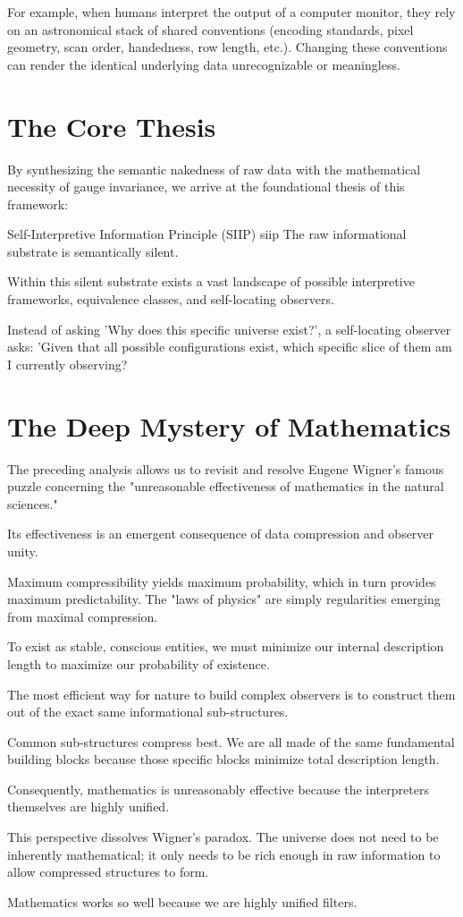 For example, when humans interpret the output of a computer monitor, they rely on an astronomical stack of shared conventions (encoding standards,
pixel geometry, scan order, handedness, row length, etc.). Changing these conventions can render the identical underlying data unrecognizable or meaningless.



\section{The Core Thesis}

By synthesizing the semantic nakedness of raw data with the mathematical necessity of gauge invariance, we arrive at the foundational thesis of this framework:

\begin{principle}{Self-Interpretive Information Principle (SIIP)}
{siip}
The raw informational substrate is semantically silent.

Within this silent substrate exists a vast landscape of possible interpretive frameworks, equivalence classes, and self-locating observers.
\end{principle}

Instead of asking 'Why does this specific universe exist?', a self-locating observer asks: 'Given that all possible configurations exist, which specific slice of them am I currently observing?



\section{The Deep Mystery of Mathematics}

The preceding analysis allows us to revisit and resolve Eugene Wigner's famous puzzle concerning the "unreasonable effectiveness of mathematics in the natural sciences."

Its effectiveness is an emergent consequence of data compression and observer unity.

Maximum compressibility yields maximum  probability, which in turn provides maximum predictability.
The "laws of physics" are simply regularities emerging from maximal compression.

To exist as stable, conscious entities, we must minimize our internal description length to maximize our probability of existence.

The most efficient way for nature to build complex observers is to construct them out of the exact same informational sub-structures.

Common sub-structures compress best. We are all made of the same fundamental building blocks because those specific blocks minimize total description length.

Consequently, mathematics is unreasonably effective because the interpreters themselves are highly unified.

This perspective dissolves Wigner's paradox. The universe does not need to be inherently mathematical; it only needs to be rich enough in raw information to allow compressed structures to form.

Mathematics works so well because we are highly unified filters.
